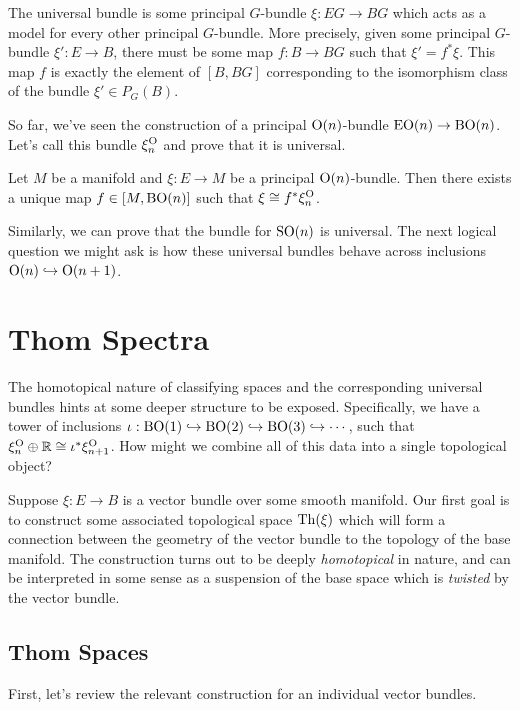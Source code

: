 \documentclass{article}
\begin{document}
The universal bundle is some principal $G$-bundle $\xi : EG \to BG$ which acts as a model for every other principal $G$-bundle. More precisely, given some principal $G$-bundle $\xi' : E \to B$, there must be some map $f : B \to BG$ such that $\xi' = f^* \xi$. This map $f$ is exactly the element of $[B, BG]$ corresponding to the isomorphism class of the bundle $\xi'\in P_G(B)$.

So far, we've seen the construction of a principal $\mathrm{O}(n)$-bundle $\mathrm{EO}(n) \to \mathrm{BO}(n)$. Let's call this bundle $\xi^{\mathrm{O}}_n$ and prove that it is universal.

\begin{proposition}
  Let $M$ be a manifold and $\xi : E \to M$ be a principal $\mathrm{O}(n)$-bundle. Then there exists a unique map $f\in [M, \mathrm{BO}(n)]$ such that $\xi\cong f^*\xi^{\mathrm{O}}_n$.
\end{proposition}

Similarly, we can prove that the bundle for $\mathrm{SO}(n)$ is universal. The next logical question we might ask is how these universal bundles behave across inclusions $\mathrm{O}(n)\hookrightarrow \mathrm{O}(n+1)$.

\section{Thom Spectra}

The homotopical nature of classifying spaces and the corresponding universal bundles hints at some deeper structure to be exposed. Specifically, we have a tower of inclusions $\iota : \mathrm{BO}(1) \hookrightarrow \mathrm{BO}(2)\hookrightarrow \mathrm{BO}(3)\hookrightarrow\cdots$, such that $\xi^{\mathrm{O}}_n\oplus \mathbb{R} \cong \iota^* \xi^{\mathrm{O}}_{n+1}$. How might we combine all of this data into a single topological object?

Suppose $\xi : E \to B$ is a vector bundle over some smooth manifold. Our first goal is to construct some associated topological space $\mathrm{Th}(\xi)$ which will form a connection between the geometry of the vector bundle to the topology of the base manifold. The construction turns out to be deeply \emph{homotopical} in nature, and can be interpreted in some sense as a suspension of the base space which is \emph{twisted} by the vector bundle. 

\subsection{Thom Spaces}
First, let's review the relevant construction for an individual vector bundles. 
\end{document}
